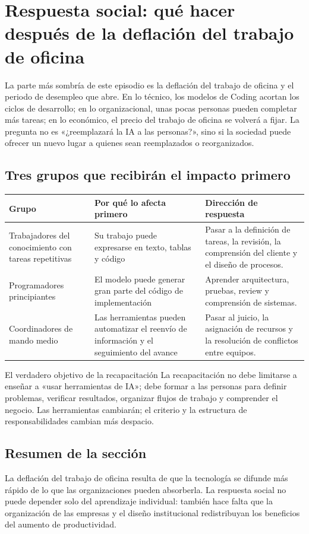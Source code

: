 \section{Respuesta social: qué hacer después de la deflación del trabajo de oficina}

La parte más sombría de este episodio es la deflación del trabajo de oficina y el periodo de desempleo que abre. En lo técnico, los modelos de Coding acortan los ciclos de desarrollo; en lo organizacional, unas pocas personas pueden completar más tareas; en lo económico, el precio del trabajo de oficina se volverá a fijar. La pregunta no es «¿reemplazará la IA a las personas?», sino si la sociedad puede ofrecer un nuevo lugar a quienes sean reemplazados o reorganizados.

\subsection{Tres grupos que recibirán el impacto primero}

\noindent\begin{tabularx}{\textwidth}{p{}p{}X}
\toprule
Grupo & Por qué lo afecta primero & Dirección de respuesta \\
\midrule
Trabajadores del conocimiento con tareas repetitivas & Su trabajo puede expresarse en texto, tablas y código & Pasar a la definición de tareas, la revisión, la comprensión del cliente y el diseño de procesos. \\
Programadores principiantes & El modelo puede generar gran parte del código de implementación & Aprender arquitectura, pruebas, review y comprensión de sistemas. \\
Coordinadores de mando medio & Las herramientas pueden automatizar el reenvío de información y el seguimiento del avance & Pasar al juicio, la asignación de recursos y la resolución de conflictos entre equipos. \\
\bottomrule
\end{tabularx}

\begin{knowledgebox}{El verdadero objetivo de la recapacitación}
La recapacitación no debe limitarse a enseñar a «usar herramientas de IA»; debe formar a las personas para definir problemas, verificar resultados, organizar flujos de trabajo y comprender el negocio. Las herramientas cambiarán; el criterio y la estructura de responsabilidades cambian más despacio.
\end{knowledgebox}

\subsection{Resumen de la sección}

La deflación del trabajo de oficina resulta de que la tecnología se difunde más rápido de lo que las organizaciones pueden absorberla. La respuesta social no puede depender solo del aprendizaje individual: también hace falta que la organización de las empresas y el diseño institucional redistribuyan los beneficios del aumento de productividad.
